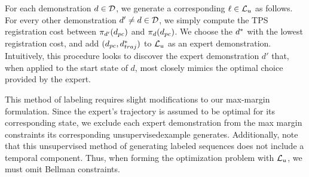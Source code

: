 For each demonstration $d{} \in \mathcal{D}{}$, we generate a corresponding
$\ell \in \mathcal{L}_u$ as follows. For every other demonstration
$d{}' \neq d{} \in \mathcal{D}{}$, we simply compute the TPS
registration cost between $\pi_{d{}'}(d_{pc})$ and
$\pi_{d{}}(d{}_{pc})$. We choose the $d{}^*$ with the
lowest registration cost, and add $(d{}_{pc}, d{}^*_{traj})$ to
$\mathcal{L}{}_u$ as an expert demonstration. Intuitively, this procedure looks to
discover the expert demonstration $d'$ that, when applied to the start state of
$d$, most closely mimics the optimal choice provided by the expert.

This method of labeling requires slight modifications to our max-margin
formulation. Since the expert's trajectory is assumed to be optimal for its
corresponding state, we exclude each expert demonstration from the max margin
constraints its corresponding unsupervisedexample generates. Additionally, note
that this unsupervised method of generating labeled sequences does not include a
temporal component. Thus, when forming the optimization problem with
$\mathcal{L}{}_u$, we must omit Bellman constraints. 
